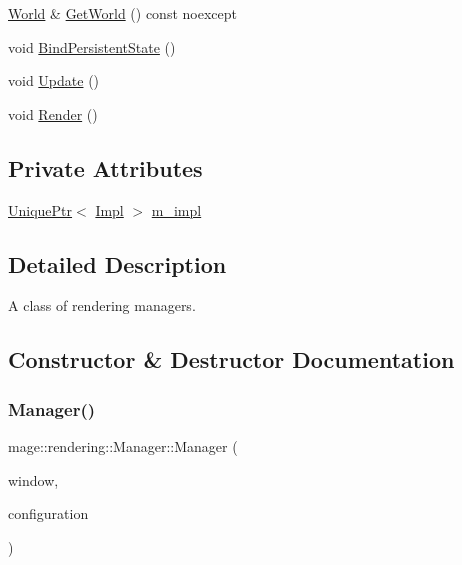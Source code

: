 \begin{DoxyCompactItemize}
\item 
\hyperlink{classmage_1_1rendering_1_1_world}{World} \& \hyperlink{classmage_1_1rendering_1_1_manager_a526b7c2db1a219e9b3bd4286e039696d}{Get\+World} () const noexcept
\item 
void \hyperlink{classmage_1_1rendering_1_1_manager_ac46b7739c7005b5a7248642ffc8299d7}{Bind\+Persistent\+State} ()
\item 
void \hyperlink{classmage_1_1rendering_1_1_manager_a878849c66920ccef910b31c80b1f033c}{Update} ()
\item 
void \hyperlink{classmage_1_1rendering_1_1_manager_a06882d964807ea63898dbe77b0c2dbc1}{Render} ()
\end{DoxyCompactItemize}
\subsection*{Private Attributes}
\begin{DoxyCompactItemize}
\item 
\hyperlink{namespacemage_a3316d7143a973e37adf1110f2e80ca31}{Unique\+Ptr}$<$ \hyperlink{classmage_1_1rendering_1_1_manager_1_1_impl}{Impl} $>$ \hyperlink{classmage_1_1rendering_1_1_manager_a1fa26fd6393941f4ef9b6863f317cd29}{m\+\_\+impl}
\end{DoxyCompactItemize}


\subsection{Detailed Description}
A class of rendering managers. 

\subsection{Constructor \& Destructor Documentation}
\hypertarget{classmage_1_1rendering_1_1_manager_acf71efbc73317b319be41682505695f1}{}\label{classmage_1_1rendering_1_1_manager_acf71efbc73317b319be41682505695f1} 
\subsubsection{\texorpdfstring{Manager()}{Manager()}\hspace{0.1cm}{\footnotesize\ttfamily [1/3]}}
{\footnotesize\ttfamily mage\+::rendering\+::\+Manager\+::\+Manager (\begin{DoxyParamCaption}\item[{\hyperlink{namespacemage_a8769f9d670d6b585ea306cb1062af94b}{Not\+Null}$<$ H\+W\+ND $>$}]{window,  }\item[{\hyperlink{classmage_1_1rendering_1_1_display_configuration}{Display\+Configuration}}]{configuration }\end{DoxyParamCaption})\hspace{0.3cm}{\ttfamily [explicit]}}

